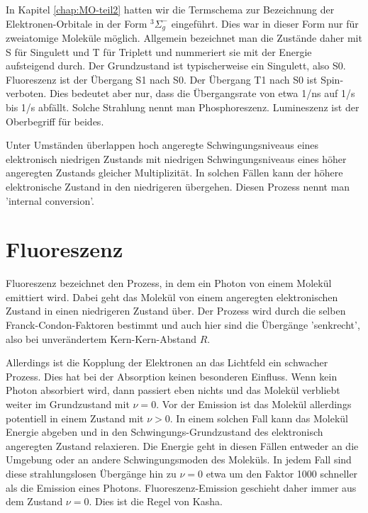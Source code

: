 In Kapitel \ref{chap:MO-teil2} hatten wir die Termschema zur Bezeichnung der Elektronen-Orbitale in der Form  $^3\Sigma_g^- $ eingeführt. Dies war in dieser Form nur für zweiatomige Moleküle möglich. Allgemein bezeichnet man die Zustände daher mit S für Singulett und T für Triplett und nummeriert sie mit der Energie aufsteigend durch. Der Grundzustand ist typischerweise ein Singulett, also S0. Fluoreszenz ist der Übergang S1 nach S0. Der Übergang T1 nach S0 ist Spin-verboten. Dies bedeutet aber nur, dass die Übergangsrate von etwa 1/ns auf 1/\textmu s bis 1/s abfällt. Solche Strahlung nennt man Phosphoreszenz. Lumineszenz ist der Oberbegriff für beides. 

Unter Umständen überlappen hoch angeregte Schwingungsniveaus eines elektronisch niedrigen Zustands mit niedrigen Schwingungsniveaus eines höher angeregten Zustands gleicher Multiplizität. In solchen Fällen kann der höhere elektronische Zustand in den niedrigeren übergehen. Diesen Prozess nennt man 'internal conversion'.


\section{Fluoreszenz}

Fluoreszenz bezeichnet den Prozess, in dem ein Photon von einem Molekül emittiert wird. Dabei geht das Molekül von einem angeregten elektronischen Zustand in einen niedrigeren Zustand über. Der Prozess wird durch die selben Franck-Condon-Faktoren bestimmt und auch hier sind die Übergänge 'senkrecht', also bei unverändertem Kern-Kern-Abstand $R$.

Allerdings ist die Kopplung der Elektronen an das Lichtfeld ein schwacher Prozess. Dies hat bei der Absorption keinen besonderen Einfluss. Wenn kein Photon absorbiert wird, dann passiert eben nichts und das Molekül verbliebt weiter im Grundzustand mit $\nu = 0$. Vor der Emission ist das Molekül allerdings potentiell in einem Zustand mit $\nu > 0$. In einem solchen Fall kann das Molekül Energie abgeben und in den Schwingungs-Grundzustand des elektronisch angeregten Zustand relaxieren. Die Energie geht in diesen Fällen entweder an die Umgebung oder an andere Schwingungsmoden des Moleküls. In jedem Fall sind diese strahlungslosen Übergänge hin zu $\nu = 0$ etwa um den Faktor 1000 schneller als die Emission eines Photons. Fluoreszenz-Emission geschieht daher immer aus dem Zustand $\nu = 0$. Dies ist die Regel von Kasha.

